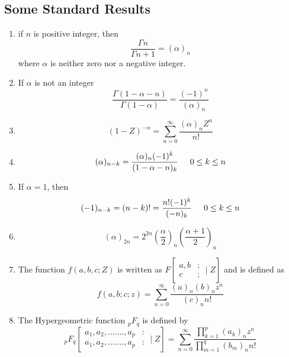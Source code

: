  \subsection{Some Standard Results}
 \begin{enumerate}
 \item if $n$ is positive integer,  then
 $$\frac{\Gamma{n}}{\Gamma{n+1}} = (\alpha)_{n}$$
where  $\alpha$ is neither zero nor a negative integer.

\item If $\alpha$ is not an integer
$$ \frac{\Gamma{(1-\alpha-n)}}{\Gamma{(1-\alpha)}} = \frac{(-1)^{n}}{(\alpha)_{n}}$$

\item $$ (1-Z)^{-\alpha} = \sum_{n=0}^{\infty}\frac{(\alpha)_{n}Z^{n}}{n!}$$

\item $$(\alpha)_{n-k} = \frac{(\alpha)_{n}(-1)^{k}}{(1-\alpha-n)_{k}} {\hspace{0.5cm}}  0\leq k\leq n $$

\item  If $ \alpha = 1$, then   
$$(-1)_{n-k} = (n-k)! =  \frac{n!(-1)^{k}}{(-n)_{k}} {\hspace{0.5cm}} 0\leq k\leq n$$

\item $$ (\alpha)_{2n} = 2^{2n}(\frac{\alpha}{2})_{n}(\frac{\alpha + 1}{2})_{n}$$
\item The function $f(a,b,c;Z)$ is written as 
$ F\left[ 
  \begin{array}{cc}
  a,b&;\\
  c&; 
  \end{array}
 \mid{Z}
 \right] $ and is defined as 
$$ f(a,b;c;z) ={ \sum_{n=0}^{\infty} \frac{(a)_{n}(b)_{n}z^{n}}{(c)_{n}n!}}$$
\item  The Hypergeometric function ${}_p F_q $ is defined by
$${}_p F_q\left[ 
  \begin{array}{cc}
  a_1, a_2,.......,a_p&:\\
  a_1, a_2,.......,a_p&: 
  \end{array}
 \mid{Z}
 \right] ={\sum_{n=0}^{\infty} \frac{\prod_{k=1}^{p}(a_{k})_{n}z^{n}}{\prod_{m=1}^{q}(b_{m})_{n}n!}}$$
 \end{enumerate}
 
